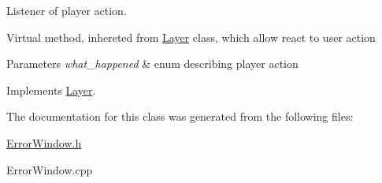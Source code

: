 Listener of player action. 

Virtual method, inhereted from \hyperlink{class_layer}{Layer} class, which allow react to user action 
\begin{DoxyParams}{Parameters}
{\em what\+\_\+happened} & enum describing player action \\
\hline
\end{DoxyParams}


Implements \hyperlink{class_layer_a41318993a0f6c7ba3bc6d964f7802c10}{Layer}.



The documentation for this class was generated from the following files\+:\begin{DoxyCompactItemize}
\item 
\hyperlink{_error_window_8h}{Error\+Window.\+h}\item 
Error\+Window.\+cpp\end{DoxyCompactItemize}
